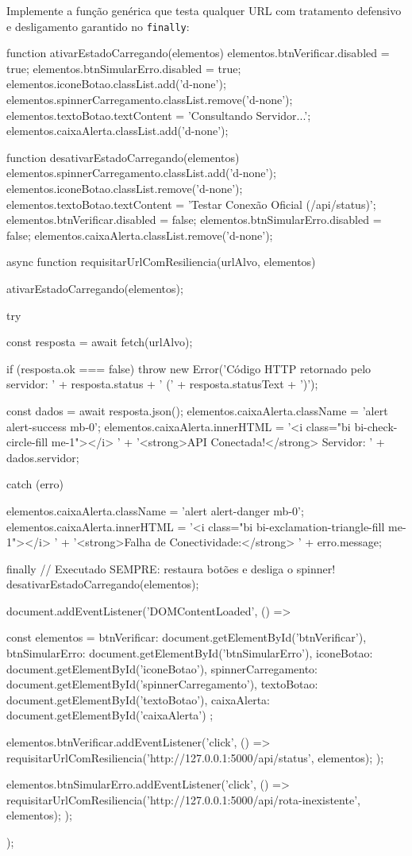 Implemente a função genérica que testa qualquer URL com tratamento defensivo e desligamento garantido no \texttt{finally}:
\begin{boxCodigoJS}
function ativarEstadoCarregando(elementos) {
  elementos.btnVerificar.disabled = true;
  elementos.btnSimularErro.disabled = true;
  elementos.iconeBotao.classList.add('d-none');
  elementos.spinnerCarregamento.classList.remove('d-none');
  elementos.textoBotao.textContent = 'Consultando Servidor...';
  elementos.caixaAlerta.classList.add('d-none');
}

function desativarEstadoCarregando(elementos) {
  elementos.spinnerCarregamento.classList.add('d-none');
  elementos.iconeBotao.classList.remove('d-none');
  elementos.textoBotao.textContent = 'Testar Conexão Oficial (/api/status)';
  elementos.btnVerificar.disabled = false;
  elementos.btnSimularErro.disabled = false;
  elementos.caixaAlerta.classList.remove('d-none');
}

async function requisitarUrlComResiliencia(urlAlvo, elementos) {
  ativarEstadoCarregando(elementos);

  try {
    const resposta = await fetch(urlAlvo);

    if (resposta.ok === false) {
      throw new Error('Código HTTP retornado pelo servidor: ' + resposta.status + ' (' + resposta.statusText + ')');
    }

    const dados = await resposta.json();
    elementos.caixaAlerta.className = 'alert alert-success mb-0';
    elementos.caixaAlerta.innerHTML =
      '<i class="bi bi-check-circle-fill me-1"></i> ' +
      '<strong>API Conectada!</strong> Servidor: ' + dados.servidor;

  } catch (erro) {
    elementos.caixaAlerta.className = 'alert alert-danger mb-0';
    elementos.caixaAlerta.innerHTML =
      '<i class="bi bi-exclamation-triangle-fill me-1"></i> ' +
      '<strong>Falha de Conectividade:</strong> ' + erro.message;

  } finally {
    // Executado SEMPRE: restaura botões e desliga o spinner!
    desativarEstadoCarregando(elementos);
  }
}

document.addEventListener('DOMContentLoaded', () => {
  const elementos = {
    btnVerificar: document.getElementById('btnVerificar'),
    btnSimularErro: document.getElementById('btnSimularErro'),
    iconeBotao: document.getElementById('iconeBotao'),
    spinnerCarregamento: document.getElementById('spinnerCarregamento'),
    textoBotao: document.getElementById('textoBotao'),
    caixaAlerta: document.getElementById('caixaAlerta')
  };

  elementos.btnVerificar.addEventListener('click', () => {
    requisitarUrlComResiliencia('http://127.0.0.1:5000/api/status', elementos);
  });

  elementos.btnSimularErro.addEventListener('click', () => {
    requisitarUrlComResiliencia('http://127.0.0.1:5000/api/rota-inexistente', elementos);
  });
});
\end{boxCodigoJS}


